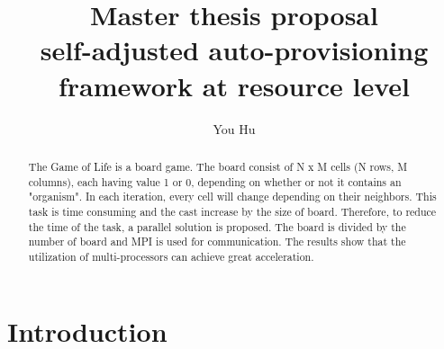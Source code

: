 \documentclass[sigchi]{acmart}
\begin{document}
\title{Master thesis proposal \\
       self-adjusted auto-provisioning framework at resource level}

\author{You Hu}



\renewcommand{\shortauthors}{You Hu}

\begin{abstract}

The Game of Life is a board game. The board consist of N x M cells (N rows, M columns), each having value 1 or 0, depending on whether or not it contains an "organism". 
In each iteration, every cell will change depending on their neighbors. 
This task is time consuming and the cast increase by the size of board.
Therefore, to reduce the time of the task, a parallel solution is proposed. 
The board is divided by the number of board and MPI is used for communication.
The results show that the utilization of multi-processors can achieve great acceleration. 
 
\end{abstract}




\maketitle

\section{Introduction}
\end{document}
